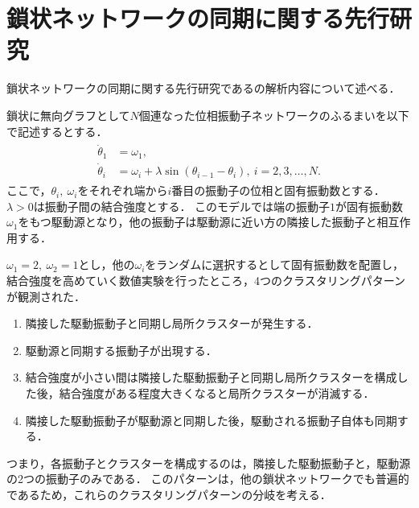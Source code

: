 \documentclass[../main]{subfiles}
\begin{document}
\chapter{鎖状ネットワークの同期に関する先行研究}
\label{chap:appendix}
鎖状ネットワークの同期に関する先行研究である\cite{XiaHuang:130506}の解析内容について述べる．

鎖状に無向グラフとして$N$個連なった位相振動子ネットワークのふるまいを以下で記述するとする．
\begin{align}
    \begin{split}
        \dot{\theta}_1&=\omega_1,\\
        \dot{\theta}_i&=\omega_i+\lambda\sin(\theta_{i-1}-\theta_i),\ i=2,3,\ldots,N.
    \end{split}
\end{align}
ここで，$\theta_i,\ \omega_i$をそれぞれ端から$i$番目の振動子の位相と固有振動数とする．$\lambda>0$は振動子間の結合強度とする．
このモデルでは端の振動子$1$が固有振動数$\omega_1$をもつ駆動源となり，他の振動子は駆動源に近い方の隣接した振動子と相互作用する．

$\omega_1=2,\ \omega_2=1$とし，他の$\omega_i$をランダムに選択するとして固有振動数を配置し，結合強度を高めていく数値実験を行ったところ，4つのクラスタリングパターンが観測された．
\renewcommand{\labelenumi}{Case  \theenumi}
\begin{enumerate}
    \item \label{enu:case1} 隣接した駆動振動子と同期し局所クラスターが発生する．
    \item \label{enu:case2} 駆動源と同期する振動子が出現する．
    \item \label{enu:case3} 結合強度が小さい間は隣接した駆動振動子と同期し局所クラスターを構成した後，結合強度がある程度大きくなると局所クラスターが消滅する．
    \item \label{enu:case4} 隣接した駆動振動子が駆動源と同期した後，駆動される振動子自体も同期する．
\end{enumerate}
つまり，各振動子とクラスターを構成するのは，隣接した駆動振動子と，駆動源の2つの振動子のみである．
このパターンは，他の鎖状ネットワークでも普遍的であるため，これらのクラスタリングパターンの分岐を考える．
\end{document}
